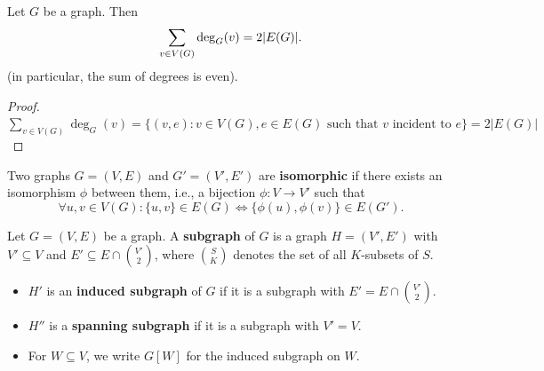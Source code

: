 \medskip

\begin{lemma}\label{1.5}
    Let $G$ be a graph. Then
    \begin{align}
        \sum\limits_{v \in V(G)} \deg_G(v) = 2 \abs{E(G)}.
    \end{align}
    (in particular, the sum of degrees is even).

    \begin{proof}   
        $\sum\limits_{v\in V(G)} \deg_G(v) = \{(v,e):v\in V(G),e\in E(G) \text{ such that } v \text{ incident to } e \} = 2|E(G)|$
    \end{proof}
\end{lemma}

\medskip

\begin{definition}\label{1.6}
    Two graphs $G=(V,E)$ and $G'=(V',E')$ are \textbf{isomorphic} if there exists
    an isomorphism $\phi$ between them, i.e., a bijection $\phi:V\to V'$ such that
    \[
        \forall u,v\in V(G):\{u,v\}\in E(G)\iff \{\phi(u),\phi(v)\}\in E(G').
    \]
\end{definition}

\medskip

\begin{definition}\label{1.7}
    Let $G=(V,E)$ be a graph. A \textbf{subgraph} of $G$ is a graph
    $H=(V',E')$ with $V'\subseteq V$ and $E'\subseteq E\cap \binom{V'}{2}$, where
    $\binom{S}{K}$ denotes the set of all $K$-subsets of $S$.

    \begin{itemize}
        \item $H'$ is an \textbf{induced subgraph} of $G$ if it is a subgraph with
            $E'=E\cap \binom{V'}{2}$.
        \item $H''$ is a \textbf{spanning subgraph} if it is a subgraph with $V'=V$.
        \item For $W\subseteq V$, we write $G[W]$ for the induced subgraph on $W$.
    \end{itemize}
\end{definition}


